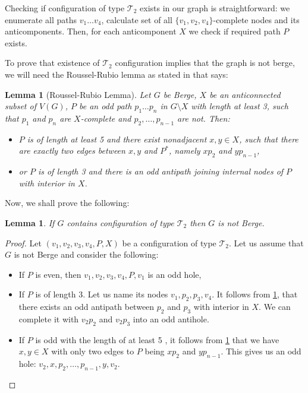 \documentclass{article}
\newtheorem{lemma}[theorem]{Lemma}
\newcommand\T{\mathcal{T}}
\begin{document}
Checking if configuration of type $\T_2$ exists in our graph is straightforward: we enumerate all paths $v_1\ldots v_4$, calculate set of all $\{v_1, v_2, v_4\}$-complete nodes and its anticomponents. Then, for each anticomponent $X$ we check if required path $P$ exists.

To prove that existence of $\T_2$ configuration implies that the graph is not berge, we will need the Roussel-Rubio lemma \cite{RR01} as stated in \cite{MC05} that says:

\begin{lemma}[Roussel-Rubio Lemma]\label{Roussel-Rubio}
	Let $G$ be Berge, $X$ be an anticonnected subset of $V(G)$, $P$ be an odd path $p_1\ldots p_n$ in $G\setminus X$ with length at least 3, such that $p_1$ and $p_n$ are $X$-complete and $p_2, \ldots, p_{n-1}$ are not. Then:
	\begin{itemize}
		\item $P$ is of length at least 5 and there exist nonadjacent $x, y \in X$, such that there are exactly two edges between $x, y$ and $P^*$, namely $xp_2$ and $yp_{n-1}$,
		\item or $P$ is of length 3 and there is an odd antipath joining internal nodes of $P$ with interior in $X$.
	\end{itemize}
\end{lemma}

Now, we shall prove the following:

\begin{lemma}
	If $G$ contains configuration of type $\T_2$ then $G$ is not Berge.
\end{lemma}
\begin{proof}
	Let $(v_1, v_2, v_3, v_4, P, X)$ be a configuration of type $\T_2$. Let us assume that $G$ is not Berge and consider the following:
	\begin{itemize}
		\item If $P$ is even, then $v_1, v_2, v_3, v_4, P, v_1$ is an odd hole,
		\item If $P$ is of length 3.  Let us name its nodes $v_1, p_2, p_3, v_4$. It follows from \cref{Roussel-Rubio}, that there exists an odd antipath between $p_2$ and $p_3$ with interior in $X$. We can complete it with $v_2p_2$ and $v_2p_3$ into an odd antihole.
		\item If $P$ is odd with the length of at least 5 , it follows from \cref{Roussel-Rubio} that we have $x, y \in X$ with only two edges to $P$ being $xp_2$ and $yp_{n-1}$. This gives us an odd hole: $v_2, x, p_2, \ldots, p_{n-1}, y, v_2$.
	\end{itemize} 
\end{proof}
\end{document}
